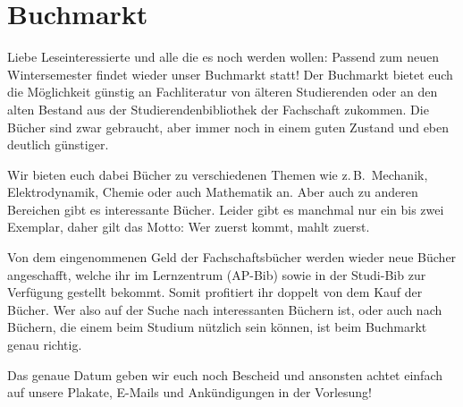 \section{Buchmarkt}
\begin{multicols*}{2}
Liebe Leseinteressierte und alle die es noch werden wollen: Passend zum neuen Wintersemester findet wieder unser Buchmarkt statt! Der Buchmarkt bietet euch die Möglichkeit günstig an Fachliteratur von älteren Studierenden oder an den alten Bestand aus der Studierendenbibliothek der Fachschaft zukommen. Die Bücher sind zwar gebraucht, aber immer noch in einem guten Zustand und eben deutlich günstiger. 

Wir bieten euch dabei Bücher zu verschiedenen Themen wie z.\,B.\ Mechanik, Elektrodynamik, Chemie oder auch Mathematik an. Aber auch zu anderen Bereichen gibt es interessante Bücher. Leider gibt es manchmal nur ein bis zwei Exemplar, daher gilt das Motto: Wer zuerst kommt, mahlt zuerst. 

Von dem eingenommenen Geld der Fachschaftsbücher werden wieder neue Bücher angeschafft, welche ihr im Lernzentrum (AP-Bib) sowie in der Studi-Bib zur Verfügung gestellt bekommt. Somit profitiert ihr doppelt von dem Kauf der Bücher. Wer also auf der Suche nach interessanten Büchern ist, oder auch nach Büchern, die einem beim Studium nützlich sein können, ist beim Buchmarkt genau richtig.

Das genaue Datum geben wir euch noch Bescheid und ansonsten achtet einfach auf unsere Plakate, E-Mails und Ankündigungen in der Vorlesung!

\end{multicols*}
